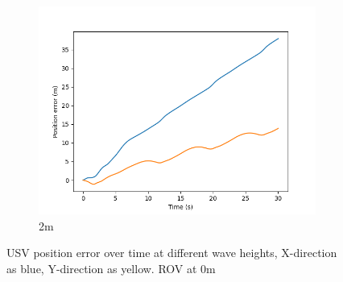 \documentclass[class=article, crop=false]{standalone}
\begin{document}
\begin{figure}
\begin{subfigure}[b]{0.48\textwidth}
        \centering
        \includegraphics{scenario1/rov-0m/2.0m/usv_pos_error_uncontrolled}
        \caption{2m}
        \label{}
    \end{subfigure}
    \caption{USV position error over time at different wave heights, X-direction as blue, Y-direction as yellow. ROV at 0m}
    \label{}
\end{figure}
\end{document}
